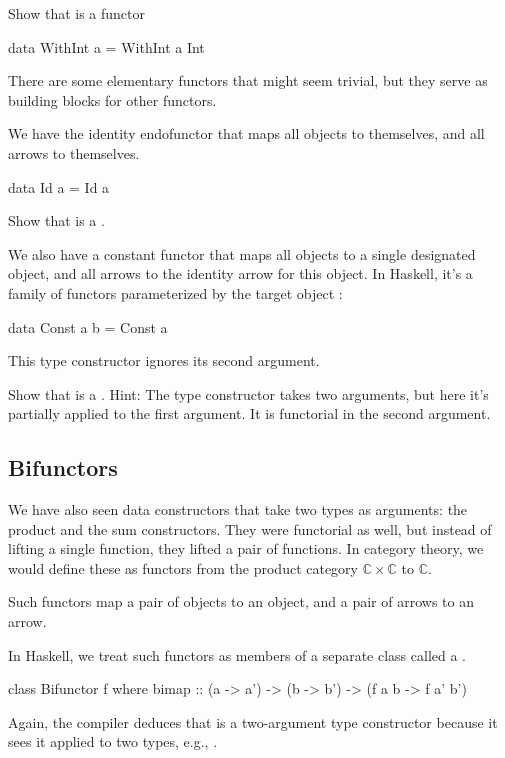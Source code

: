 \documentclass[DaoFP]{subfiles}
\begin{document}
\begin{exercise}
Show that  is a functor
\begin{haskell}
data WithInt a = WithInt a Int
\end{haskell}
\end{exercise}

There are some elementary functors that might seem trivial, but they serve as building blocks for other functors. 

We have the identity endofunctor that maps all objects to themselves, and all arrows to themselves. 
\begin{haskell}
data Id a = Id a
\end{haskell}
\begin{exercise}
Show that  is a .
\end{exercise}


We also have a constant functor that maps all objects to a single designated object, and all arrows to the identity arrow for this object. In Haskell, it's a family of functors parameterized by the target object :
\begin{haskell}
data Const a b = Const a
\end{haskell}
This type constructor ignores its second argument.


\begin{exercise}
Show that  is a . Hint: The type constructor takes two arguments, but here it's partially applied to the first argument. It is functorial in the second argument.
\end{exercise}


\subsection{Bifunctors}

We have also seen data constructors that take two types as arguments: the product and the sum constructors. They were functorial as well, but instead of lifting a single function, they lifted a pair of functions. In category theory, we would define these as functors from the product category $\mathbb{C} \times \mathbb{C}$ to $\mathbb{C}$.

Such functors map a pair of objects to an object, and a pair of arrows to an arrow. 

In Haskell, we treat such functors as members of a separate class called a .

\begin{haskell}
class Bifunctor f where
  bimap :: (a -> a') -> (b -> b') -> (f a b -> f a' b')
\end{haskell}
Again, the compiler deduces that  is a two-argument type constructor because it sees it applied to two types, e.g., .
\end{document}
